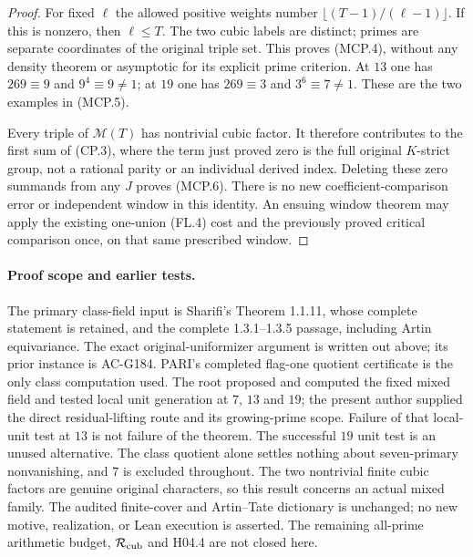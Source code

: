 \begin{proof}
For fixed $\ell$ the allowed positive weights number
$\lfloor(T-1)/(\ell-1)\rfloor$.  If this is nonzero, then
$\ell\leq T$.  The two cubic labels are distinct; primes are
separate coordinates of the original triple set.  This proves
(MCP.4), without any density theorem or asymptotic for its
explicit prime criterion.  At $13$ one has $269\equiv9$ and
$9^4\equiv9\ne1$; at $19$ one has $269\equiv3$ and
$3^6\equiv7\ne1$.  These are the two examples in (MCP.5).

Every triple of $\mathcal M(T)$ has nontrivial cubic factor.
It therefore contributes to the first sum of (CP.3), where
the term just proved zero is the full original $K$-strict group,
not a rational parity or an individual derived index.
Deleting these zero summands from any $J$ proves (MCP.6).
There is no new coefficient-comparison error or independent
window in this identity.  An ensuing window theorem may apply
the existing one-union (FL.4) cost and the previously proved
critical comparison once, on that same prescribed window.
\end{proof}

\paragraph{Proof scope and earlier tests.}
The primary class-field input is Sharifi's Theorem 1.1.11, whose
complete statement is retained, and the complete 1.3.1--1.3.5 passage, including Artin
equivariance.  The exact original-uniformizer argument is written
out above; its prior instance is AC-G184.  PARI's completed
flag-one quotient certificate is the only class computation used.
The root proposed and computed the fixed mixed field and tested
local unit generation at $7$, $13$ and $19$; the present author
supplied the direct residual-lifting route and its growing-prime
scope.  Failure of that local-unit test at $13$ is not failure of
the theorem.  The successful $19$ unit test is an unused
alternative.  The class quotient alone settles nothing about
seven-primary nonvanishing, and $7$ is excluded throughout.
The two nontrivial finite cubic factors are genuine original
characters, so this result concerns an actual mixed family.
The audited finite-cover and Artin--Tate dictionary is unchanged;
no new motive, realization, or Lean execution is asserted.
The remaining all-prime arithmetic budget, $\mathcal R_{\rm cub}$
and H04.4 are not closed here.


